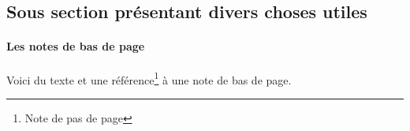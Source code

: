 \subsection{Sous section présentant divers choses utiles}

\paragraph{Les notes de bas de page} Voici du texte et une référence\footnote{Note de pas de page} à une note de bas de page.
